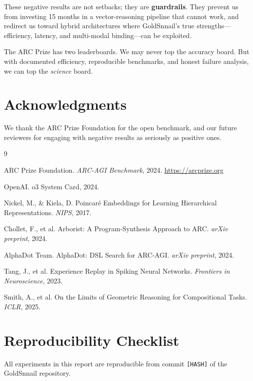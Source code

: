 \documentclass[11pt,a4paper]{article}
\begin{document}
These negative results are not setbacks; they are \textbf{guardrails}. They prevent us from investing 15 months in a vector-reasoning pipeline that cannot work, and redirect us toward hybrid architectures where GoldSnnail's true strengths---efficiency, latency, and multi-modal binding---can be exploited.

The ARC Prize has two leaderboards. We may never top the accuracy board. But with documented efficiency, reproducible benchmarks, and honest failure analysis, we can top the \emph{science} board.

\section*{Acknowledgments}

We thank the ARC Prize Foundation for the open benchmark, and our future reviewers for engaging with negative results as seriously as positive ones.


\begin{thebibliography}{9}

ARC Prize Foundation. \textit{ARC-AGI Benchmark}, 2024. \url{https://arcprize.org}

OpenAI. o3 System Card, 2024.

Nickel, M., \& Kiela, D. Poincaré Embeddings for Learning Hierarchical Representations. \textit{NIPS}, 2017.

Chollet, F., et al. Arborist: A Program-Synthesis Approach to ARC. \textit{arXiv preprint}, 2024.

AlphaDot Team. AlphaDot: DSL Search for ARC-AGI. \textit{arXiv preprint}, 2024.

Tang, J., et al. Experience Replay in Spiking Neural Networks. \textit{Frontiers in Neuroscience}, 2023.

Smith, A., et al. On the Limits of Geometric Reasoning for Compositional Tasks. \textit{ICLR}, 2025.

\end{thebibliography}

\appendix
\section{Reproducibility Checklist}

All experiments in this report are reproducible from commit \texttt{[HASH]} of the GoldSnnail repository.
\end{document}
